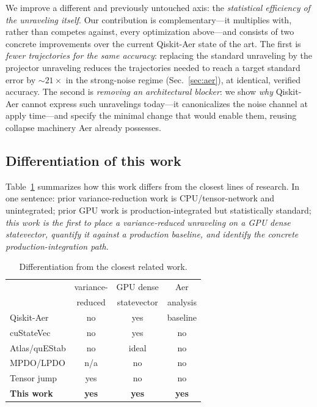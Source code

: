 \documentclass{ieeeaccess}
\begin{document}
We improve a different and previously untouched axis: the \emph{statistical efficiency of the unraveling
itself}. Our contribution is complementary---it multiplies with, rather than competes against, every
optimization above---and consists of two concrete improvements over the current Qiskit-Aer state of the
art. The first is \emph{fewer trajectories for the same accuracy}: replacing the standard unraveling by
the projector unraveling reduces the trajectories needed to reach a target standard error by
$\sim\!21\times$ in the strong-noise regime (Sec.~\ref{sec:aer}), at identical, verified accuracy. The
second is \emph{removing an architectural blocker}: we show \emph{why} Qiskit-Aer cannot express such
unravelings today---it canonicalizes the noise channel at apply time---and specify the minimal change
that would enable them, reusing collapse machinery Aer already possesses.

\subsection{Differentiation of this work}
Table~\ref{tab:diff} summarizes how this work differs from the closest lines of research. In one sentence:
prior variance-reduction work is CPU/tensor-network and unintegrated; prior GPU work is
production-integrated but statistically standard; \emph{this work is the first to place a
variance-reduced unraveling on a GPU dense statevector, quantify it against a production baseline, and
identify the concrete production-integration path.}

\begin{table}[t]
\caption{Differentiation from the closest related work.}
\label{tab:diff}
\centering
\footnotesize
\setlength{\tabcolsep}{3.5pt}
\begin{tabular}{@{}lccc@{}}
\toprule
 & variance- & GPU dense & Aer \\
 & reduced & statevector & analysis \\
\midrule
Qiskit-Aer \cite{qiskit_aer,efficient_multishot2023} & no & yes & baseline \\
cuStateVec \cite{cuquantum2023}                      & no & yes & no \\
Atlas/quEStab \cite{atlas_sc24,questab_ics25}        & no & ideal & no \\
MPDO/LPDO \cite{mpdo_prr,lpdo2023}                   & n/a & no & no \\
Tensor jump \cite{tjm2026}                           & yes & no & no \\
\textbf{This work}                                   & \textbf{yes} & \textbf{yes} & \textbf{yes} \\
\bottomrule
\end{tabular}
\end{table}
\end{document}
